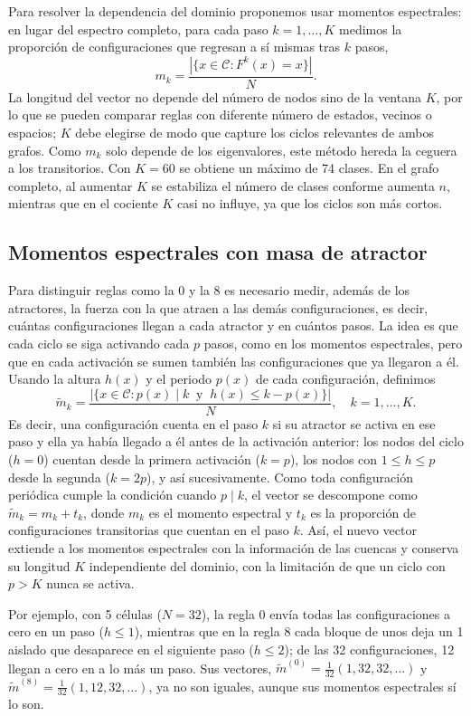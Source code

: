 Para resolver la dependencia del dominio proponemos usar momentos espectrales: en lugar del espectro completo, para cada paso $k = 1, \dots, K$ medimos la proporción de configuraciones que regresan a sí mismas tras $k$ pasos,
\[
  m_k = \frac{|\{x \in \mathcal{C} : F^k(x) = x\}|}{N}.
\]
La longitud del vector no depende del número de nodos sino de la ventana $K$, por lo que se pueden comparar reglas con diferente número de estados, vecinos o espacios; $K$ debe elegirse de modo que capture los ciclos relevantes de ambos grafos. Como $m_k$ solo depende de los eigenvalores, este método hereda la ceguera a los transitorios. Con $K = 60$ se obtiene un máximo de 74 clases. En el grafo completo, al aumentar $K$ se estabiliza el número de clases conforme aumenta $n$, mientras que en el cociente $K$ casi no influye, ya que los ciclos son más cortos.

\subsection{Momentos espectrales con masa de atractor}
\label{subsec:attractor_mass}

Para distinguir reglas como la 0 y la 8 es necesario medir, además de los atractores, la fuerza con la que atraen a las demás configuraciones, es decir, cuántas configuraciones llegan a cada atractor y en cuántos pasos. La idea es que cada ciclo se siga activando cada $p$ pasos, como en los momentos espectrales, pero que en cada activación se sumen también las configuraciones que ya llegaron a él. Usando la altura $h(x)$ y el periodo $p(x)$ de cada configuración, definimos
\[
  \tilde{m}_k = \frac{|\{x \in \mathcal{C} : p(x) \mid k \ \text{ y } \ h(x) \le k - p(x)\}|}{N}, \quad k = 1, \dots, K.
\]
Es decir, una configuración cuenta en el paso $k$ si su atractor se activa en ese paso y ella ya había llegado a él antes de la activación anterior: los nodos del ciclo ($h = 0$) cuentan desde la primera activación ($k = p$), los nodos con $1 \le h \le p$ desde la segunda ($k = 2p$), y así sucesivamente. Como toda configuración periódica cumple la condición cuando $p \mid k$, el vector se descompone como $\tilde{m}_k = m_k + t_k$, donde $m_k$ es el momento espectral y $t_k$ es la proporción de configuraciones transitorias que cuentan en el paso $k$. Así, el nuevo vector extiende a los momentos espectrales con la información de las cuencas y conserva su longitud $K$ independiente del dominio, con la limitación de que un ciclo con $p > K$ nunca se activa.

Por ejemplo, con 5 células ($N = 32$), la regla 0 envía todas las configuraciones a cero en un paso ($h \le 1$), mientras que en la regla 8 cada bloque de unos deja un 1 aislado que desaparece en el siguiente paso ($h \le 2$); de las 32 configuraciones, 12 llegan a cero en a lo más un paso. Sus vectores, $\tilde{m}^{(0)} = \tfrac{1}{32}(1, 32, 32, \dots)$ y $\tilde{m}^{(8)} = \tfrac{1}{32}(1, 12, 32, \dots)$, ya no son iguales, aunque sus momentos espectrales sí lo son.

